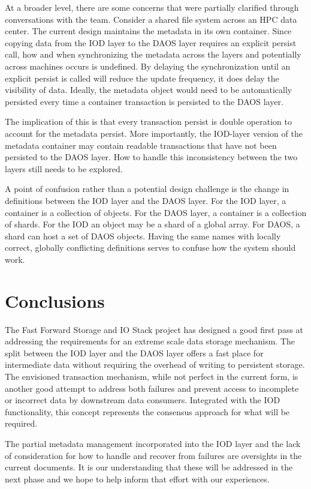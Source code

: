 \documentclass[conference]{IEEEtran}
\begin{document}
At a broader level, there are some concerns that were partially clarified
through conversations with the team.  Consider a shared file system across an
HPC data center. The current design maintains the metadata in its own
container. Since copying data from the IOD layer to the DAOS layer requires an
explicit persist call, how and when synchronizing the metadata across the 
layers and potentially across machines occurs is undefined. By delaying the
synchronization until an explicit persist is called will reduce the update
frequency, it does delay the visibility of data. Ideally, the metadata object
would need to be automatically persisted every time a container transaction is
persisted to the DAOS layer.

The implication of this is that every transaction persist is double operation
to account for the metadata persist. More importantly, the IOD-layer version of
the metadata container may contain readable transactions that have not been
persisted to the DAOS layer. How to handle this inconsistency between the two
layers still needs to be explored.

A point of confusion rather than a potential design challenge is the change in
definitions between the IOD layer and the DAOS layer.  For the IOD layer, a
container is a collection of objects. For the DAOS layer, a container is a
collection of shards. For the IOD an object may be a shard of a global array.
For DAOS, a shard can host a set of DAOS objects. Having the same names with
locally correct, globally conflicting definitions serves to confuse how the
system should work.

\section{Conclusions}
\label{sec:conclusion}

The Fast Forward Storage and IO Stack project has designed a good first pass at
addressing the requirements for an extreme scale data storage mechanism. The
split between the IOD layer and the DAOS layer offers a fast place for
intermediate data without requiring the overhead of writing to persistent
storage. The envisioned transaction mechanism, while not perfect in the current
form, is another good attempt to address both failures and prevent access to
incomplete or incorrect data by downstream data consumers. Integrated with the
IOD functionality, this concept represents the consensus approach for what will
be required.

The partial metadata management incorporated into the IOD layer and the lack of
consideration for how to handle and recover from failures are oversights in the
current documents. It is our understanding that these will be addressed in the
next phase and we hope to help inform that effort with our experiences.
\end{document}
